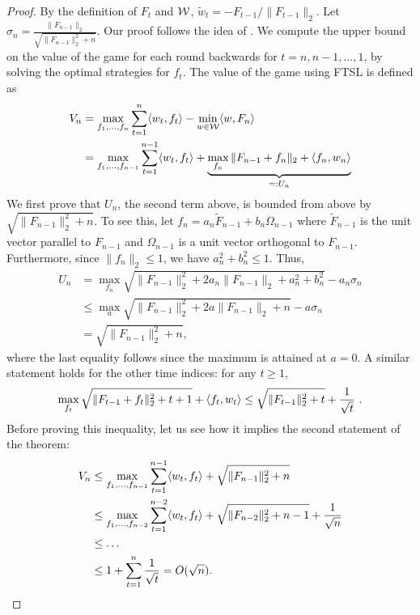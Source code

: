 \begin{proof}
	By the definition of $F_t$ and $\mathcal{W}$, $\tilde{w}_{t} =- F_{t-1}/\|F_{t-1}\|_2$.
	Let $\sigma_n = \frac{\|F_{n-1}\|_2}{\sqrt{\|F_{n-1}\|_2^2 + n}}$.
	Our proof follows the idea of \citet{abernethy2008optimal}. We compute the upper bound on the value of the game for each round backwards for $t=n,n-1,\dots,1$, by solving the optimal strategies for $f_t$.
	The value of the game using FTSL is defined as
	\begin{align*}
	V_n & = \max_{f_1, \ldots, f_n} \sum_{t=1}^{n}\langle w_t, f_t\rangle- \min_{w\in\mathcal{W}} \langle w, F_n\rangle \\
	& = \max_{f_1,\ldots, f_{n-1}} \sum_{t=1}^{n-1}\langle w_t, f_t\rangle + \underbrace{\max_{f_n} \|F_{n-1}+f_n\|_2 + \langle f_n, w_n\rangle}_{=:U_n}
	\end{align*}
We first prove that $U_n$, the second term above, is bounded from above by  $\sqrt{\|F_{n-1}\|_2^2 + n}$. To see this, let $f_n = a_n \tilde{F}_{n-1} + b_n \Omega_{n-1}$ where $\tilde{F}_{n-1}$ is the unit vector parallel to $F_{n-1}$ and $\Omega_{n-1}$ is a unit vector orthogonal to $F_{n-1}$.  Furthermore, since $\|f_n\|_2 \le 1$, we have $a_n^2+b_n^2 \le 1$.
Thus,
\begin{align*}
U_n & = \max_{f_n} \sqrt{\|F_{n-1}\|_2^2 + 2a_n\|F_{n-1}\|_2 + a_n^2 + b_n^2} - a_n\sigma_{n}\\
 & \le \max_{a} \sqrt{\|F_{n-1}\|_2^2 + 2a\|F_{n-1}\|_2 + n} - a\sigma_{n}\\
 & = \sqrt{\|F_{n-1}\|_2^2 + n},
\end{align*}  
where the last equality follows since the maximum is attained at $a=0$. 
A similar statement holds for the other time indices: for any $t \ge 1$,
\begin{equation}
\label{eq:stepDiff1}
\max_{f_t} \sqrt{\|F_{t-1} + f_t\|_2^2 + t + 1} + \langle f_t, w_t\rangle \le  \sqrt{\|F_{t-1}\|_2^2 + t} + \frac{1}{\sqrt{t}}~.
\end{equation}
Before proving this inequality, let us see how it implies the second statement of the theorem:
\begin{align*}
V_n & \le \max_{f_1,\ldots, f_{n-1}} \sum_{t=1}^{n-1}\langle w_t, f_t\rangle + \sqrt{\|F_{n-1}\|_2^2 + n} \\
& \le \max_{f_1,\ldots, f_{n-2}} \sum_{t=1}^{n-2}\langle w_t, f_t\rangle  + \sqrt{\|F_{n-2}\|_2^2 + n-1} + \frac{1}{\sqrt{n}} \\
& \le \ldots \\
& \le 1+ \sum_{t=1}^{n}\frac{1}{\sqrt{t}} = O(\sqrt{n}).
\end{align*}

\end{proof}
